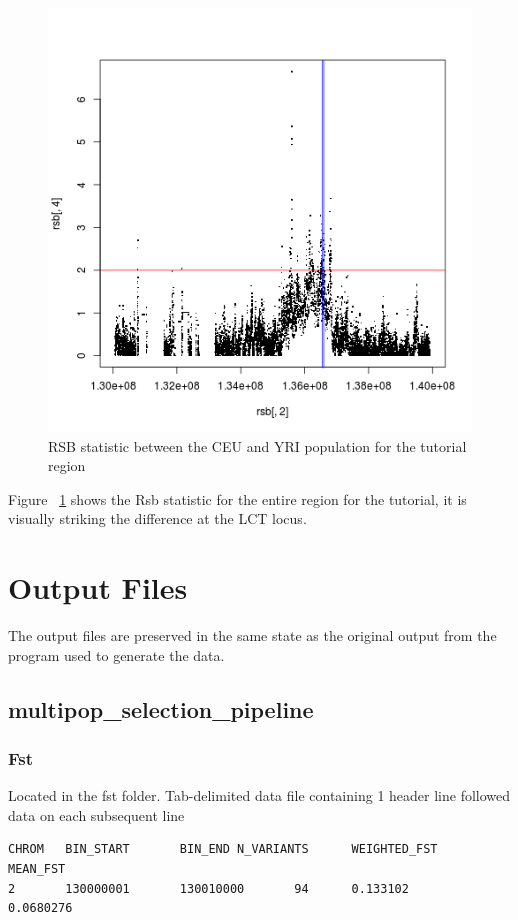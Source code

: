 \documentclass[a4paper,10pt]{article}
\begin{document}
\begin{figure}
\centering
\includegraphics{pictures/RSBCEUYRI.png}
\caption{RSB statistic between the CEU and YRI population for the tutorial region} 
\label{fig:rsb}
\end{figure}
Figure ~\ref{fig:rsb} shows the Rsb statistic for the entire region for the tutorial, it is visually striking the difference at the LCT locus.

\pagebreak
\section{Output Files}
The output files are preserved in the same state as the original output from the program used to generate the data.
\subsection{multipop\_selection_pipeline}
\subsubsection{Fst}
Located in the fst folder. Tab-delimited data file containing 1 header line followed data on each subsequent line\\
\begin{verbatim}
CHROM   BIN_START       BIN_END N_VARIANTS      WEIGHTED_FST    MEAN_FST  
2       130000001       130010000       94      0.133102        0.0680276 
\end{verbatim}
\end{document}
